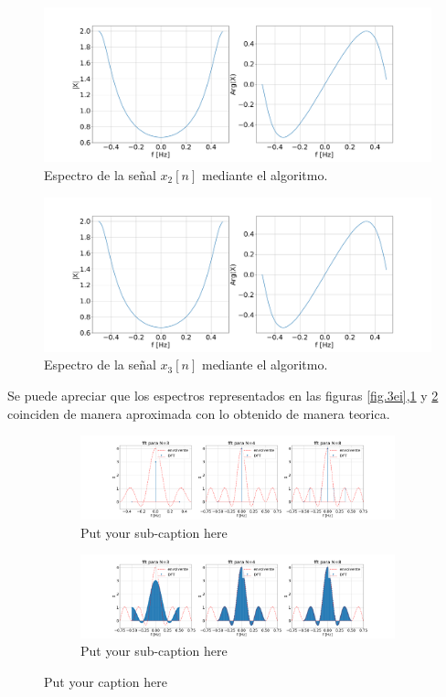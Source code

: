 \documentclass[11pt,a4paper]{article}
\begin{document}
    \begin{figure}[H]
    \centering
    \includegraphics[width=\textwidth]{Img/punto_3_e_3.png}
    \caption{Espectro de la señal $x_{2}[n]$ mediante el algoritmo.}
    \label{fig.3eii}
    \end{figure}

    \begin{figure}[H]
    \centering
    \includegraphics[width=\textwidth]{Img/punto_3_e_3.png}
    \caption{Espectro de la señal $x_{3}[n]$ mediante el algoritmo.}
    \label{fig.3eiii}
    \end{figure}

    Se puede apreciar que los espectros representados en las figuras \ref{fig.3ei},\ref{fig.3eii} y \ref{fig.3eiii} coinciden de manera aproximada con lo obtenido de manera teorica. 
    
    
\begin{figure}[htb]
\begin{subfigure}{.6\textwidth}
  \centering
  \includegraphics[width=.8\linewidth]{Img/punto_3_b.png}  
  \caption{Put your sub-caption here}
  \label{fig:sub-first}
\end{subfigure}
\begin{subfigure}{.6\textwidth}
  \centering
  \includegraphics[width=\linewidth]{Img/punto_3_c.png}  
  \caption{Put your sub-caption here}
  \label{fig:sub-second}
\end{subfigure}
\caption{Put your caption here}
\label{fig:fig}
\end{figure}
\end{document}
